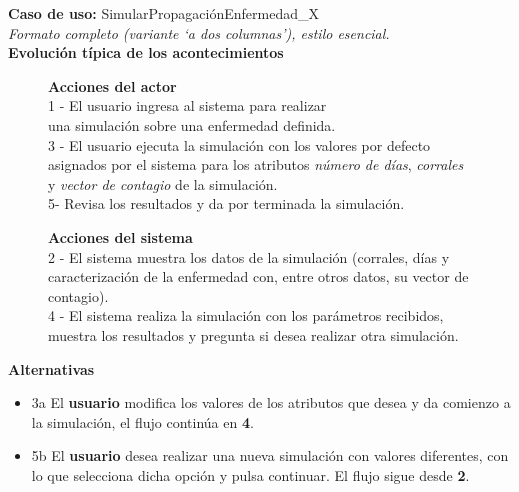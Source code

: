 \documentclass[a4paper]{article}
\begin{document}
	\textbf{Caso de uso:} SimularPropagaciónEnfermedad\_X\\
	\textit{Formato completo (variante ‘a dos columnas’), estilo esencial.}\\
	\textbf{Evolución típica de los acontecimientos}\\
\begin{figure}[H]
	\begin{minipage}[t]{0.48\linewidth}
		\textbf{Acciones del actor}
		\vspace{1em}
		\\
		1 - El usuario ingresa al sistema para realizar \\una simulación sobre una enfermedad definida.
		\vspace{4em}
		\\
		3 - El usuario ejecuta la simulación con los valores por defecto asignados por el sistema para los atributos \textit{número de días}, \textit{corrales} y \textit{vector de contagio} de la simulación.
		\vspace{5em}
		\\
		5- Revisa los resultados y da por terminada la simulación.
		\vspace{2em}
		\\	
		
	\end{minipage}
	\hspace{0.2cm}
	\begin{minipage}[t]{0.08\linewidth}
	\end{minipage}
	\begin{minipage}[t]{0.48\linewidth}
		\textbf{Acciones del sistema}
		\vspace{3em}
		\\
		2 - El sistema muestra los datos de la simulación (corrales, días y  caracterización de la enfermedad con, entre otros datos, su vector de contagio).
		\vspace{6em}
		\\
		4 - El sistema realiza la simulación con los parámetros recibidos, muestra los resultados y pregunta si desea realizar otra simulación.
		\vspace{2em}
	\end{minipage}
\end{figure}
\textbf{Alternativas}
\begin{itemize}
	\item 3a El \textbf{usuario} modifica los valores de los atributos que desea y da comienzo a la simulación, el flujo continúa en \textbf{4}.	
	\item 5b El \textbf{usuario} desea realizar una nueva simulación con valores diferentes, con lo que selecciona dicha opción y pulsa continuar. El flujo sigue desde \textbf{2}.
\end{itemize}
\end{document}
